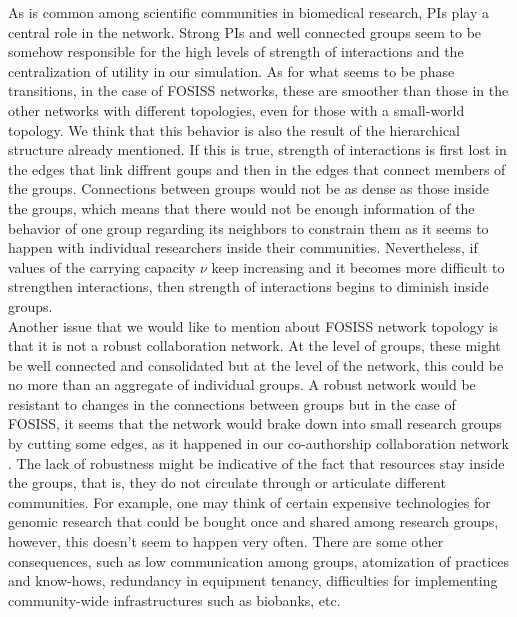 \documentclass[11pt]{article}
\begin{document}
{{\color{red}As is common among scientific communities in biomedical research, PIs play a central role in the network. Strong PIs and
well connected groups seem to be somehow responsible for the high levels of strength of interactions and the centralization of utility in
our simulation. As for what seems to be phase transitions, in the case of FOSISS networks, these are smoother than
those in the other networks with different topologies, even for those with a small-world topology. We think that this
behavior is also the result of the hierarchical structure already mentioned. If this is true, strength of interactions is first lost in the
edges that link diffrent goups and then in the edges that connect members of the groups. Connections between groups would not
be as dense as those inside the groups, which means that there would not be enough information of the behavior of one group regarding
its neighbors to constrain them as it seems to happen with individual researchers inside their communities. Nevertheless,
if values of the carrying capacity $\nu$ keep increasing and it becomes more
difficult to strengthen interactions, then strength of interactions begins to diminish inside groups.}\\

{\color{red}Another issue that we would like to mention about FOSISS network topology is that it is not a robust collaboration network.
At the level of groups, these might be well connected and consolidated but at the level of the network, this could be
no more than an aggregate of individual groups. A robust network would be resistant to changes in the connections
between groups but in the case of FOSISS, it seems that the network would brake down into
small research groups by cutting some edges, as it happened in our co-authorship
collaboration network \cite{HernandezLemus2013}. The lack of robustness might be 
indicative of the fact that resources stay inside the groups, that is, they do not circulate through or articulate different communities. For
example, one may think of certain expensive technologies for genomic research that could be bought once and shared
among research groups, however, this doesn't seem to happen very often. There are some other
consequences, such as low communication among groups, atomization of practices and know-hows, redundancy in equipment tenancy,
difficulties for implementing community-wide infrastructures such as biobanks, etc.}\\ 

}
\end{document}
